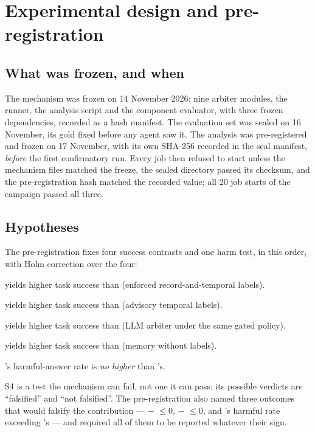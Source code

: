 \section{Experimental design and pre-registration}
\label{sec:design}



\subsection{What was frozen, and when}

The mechanism was frozen on 14 November 2026: nine arbiter modules, the runner, the analysis script and the
component evaluator, with three frozen dependencies, recorded as a hash manifest. The evaluation set was sealed on
16 November, its gold fixed before any agent saw it. The analysis was pre-registered and frozen on 17 November,
with its own SHA-256 recorded in the seal manifest, \emph{before} the first confirmatory run. Every job then
refused to start unless the mechanism files matched the freeze, the sealed directory passed its checksum, and the
pre-registration hash matched the recorded value; all 20 job starts of the campaign passed all three.

\subsection{Hypotheses}

The pre-registration fixes four success contrasts and one harm test, in this order, with Holm correction over the
four:

\begin{description}[leftmargin=4.4em,itemsep=1pt,topsep=2pt,font=\normalfont\sffamily]
\item[H-primary]  yields higher task success than  (enforced record-and-temporal labels).
\item[S1]  yields higher task success than  (advisory temporal labels).
\item[S2]  yields higher task success than  (LLM arbiter under the same gated policy).
\item[S3]  yields higher task success than  (memory without labels).
\item[S4] 's harmful-answer rate is \emph{no higher} than 's.
\end{description}

S4 is a test the mechanism can fail, not one it can pass: its possible verdicts are ``falsified'' and ``not
falsified''. The pre-registration also named three outcomes that would falsify the contribution ---
 $-$  $\le 0$,  $-$  $\le 0$, and 's harmful rate exceeding
's --- and required all of them to be reported whatever their sign.

